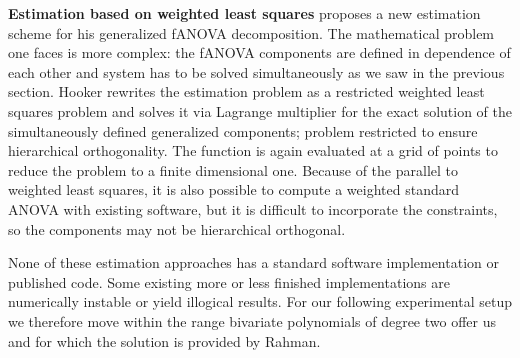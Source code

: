 \textbf{Estimation based on weighted least squares}
\cite{hooker2007} proposes a new estimation scheme for his generalized fANOVA decomposition. The mathematical problem one faces is more complex: the fANOVA components are defined in dependence of each other and system has to be solved simultaneously as we saw in the previous section.
Hooker rewrites the estimation problem as a restricted weighted least squares problem and solves it via Lagrange multiplier for the exact solution of the simultaneously defined generalized components; problem restricted to ensure hierarchical orthogonality.
The function is again evaluated at a grid of points to reduce the problem to a finite dimensional one. 
Because of the parallel to weighted least squares, it is also possible to compute a weighted standard ANOVA with existing software, but it is difficult to incorporate the constraints, so the components may not be hierarchical orthogonal.\par

None of these estimation approaches has a standard software implementation or published code. Some existing more or less finished implementations are numerically instable or yield illogical results. For our following experimental setup we therefore move within the range bivariate polynomials of degree two offer us and for which the solution is provided by Rahman.




